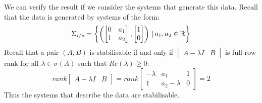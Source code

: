 We can verify the result if we consider the systems that generate this data. Recall that the data is generated by systems of the form:
\[ \Sigma_{i/s} = \left\{ \left( \begin{bmatrix} 0&a_1 \\ 1&a_2 \end{bmatrix}, \begin{bmatrix} 1 \\ 0 \end{bmatrix} \right) \, | \, a_1, a_2 \in \mathbb{R} \right\} \]
Recall that a pair $(A,B)$ is stabilisable if and only if $\begin{bmatrix} A - \lambda I & B \end{bmatrix}$ is full row rank for all $\lambda \in \sigma(A)$ such that $Re(\lambda) \geq 0$:
\[ rank \begin{bmatrix} A - \lambda I & B \end{bmatrix} = rank \begin{bmatrix} -\lambda & a_1 & 1 \\ 1 & a_2 - \lambda & 0 \end{bmatrix} = 2 \]
Thus the systems that describe the data are stabilisable.